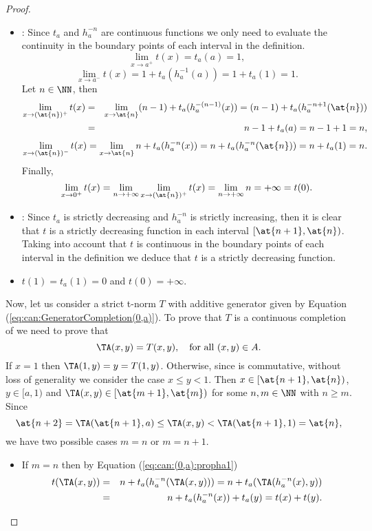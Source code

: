 \begin{proof}
\begin{description}
		\begin{itemize}
			\item \underline{}: Since $t_a$ and $h_a^{-n}$ are continuous functions we only need to evaluate the continuity in the boundary points of each interval in the definition.
			$$\lim_{x \to a^+} t(x) = t_a(a)=1,$$
			$$\lim_{x \to a^-} t(x)= 1 + t_a(h_a^{-1}(a))=1+t_a(1)=1.$$
			Let $n \in \NN$, then 
			\begin{eqnarray*}
				\lim_{x \to (\at{n})^+}t(x) &=& \lim_{x \to \at{n}} (n-1)+t_a(h_a^{-(n-1)}(x)) = (n-1)+t_a(h_a^{-n+1}(\at{n}))\\
				&=& n-1+t_a(a)=n-1+1=n,
			\end{eqnarray*}
			$$\lim_{x \to (\at{n})^-}t(x) = \lim_{x \to \at{n}} n+t_a(h_a^{-n}(x)) = n + t_a(h_a^{-n}(\at{n})) = n + t_a(1)=n.$$
			Finally,
			$$\lim_{x \to 0^+} t(x) = \lim_{n \to + \infty} \lim_{x \to (\at{n})^+} t(x) =  \lim_{n \to + \infty} n = +\infty=t(0).$$
			\item \underline{}: Since $t_a$ is strictly decreasing and $h_a^{-n}$ is strictly increasing, then it is clear that $t$ is a strictly decreasing function in each interval $[\at{n+1},\at{n})$. Taking into account that $t$ is continuous in the boundary points of each interval in the definition we deduce that $t$ is a strictly decreasing function.
			\item $t(1)=t_a(1)=0$ and $t(0)=+\infty$.
		\end{itemize}
		Now, let us consider a strict t-norm $T$ with additive generator given by Equation (\ref{eq:can:GeneratorCompletion(0,a)}). To prove that $T$ is a continuous completion of \TA we need to prove that
		$$\TA(x,y)=T(x,y), \quad \text{for all } (x,y) \in A.$$
		If $x=1$ then $\TA(1,y)=y=T(1,y)$. Otherwise, since \TA is commutative, without loss of generality we consider the case $x \leq y < 1$. Then $x \in [\at{n+1},\at{n})$, $y \in [a,1)$ and $\TA(x,y) \in [\at{m+1},\at{m})$ for some $n,m \in \NN$ with $n \geq m$. Since
		$$\at{n+2}=\TA(\at{n+1},a)\leq \TA(x,y) < \TA(\at{n+1},1)=\at{n},$$
		we have two possible cases $m=n$ or $m=n+1$.
		\begin{itemize}
			\item If $m=n$ then by Equation (\ref{eq:can:(0,a):propha1}) 
			\begin{eqnarray*}
				t(\TA(x,y)) &=& n + t_a(h_a^{-n}(\TA(x,y))) = n + t_a(\TA(h_a^{-n}(x),y)) \\
				&=& n + t_a(h_a^{-n}(x)) + t_a(y) = t(x)+t(y).
			\end{eqnarray*}

\end{itemize}
\end{description}
\end{proof}
